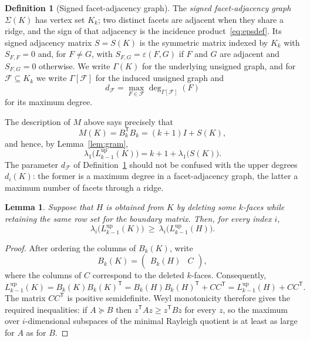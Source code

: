 \documentclass[11pt,reqno]{amsart}
\numberwithin{equation}{section}
\theoremstyle{plain}
\newtheorem{lemma}[theorem]{Lemma}
\theoremstyle{definition}
\newtheorem{definition}[theorem]{Definition}
\newcommand{\Lup}{L^{\mathrm{up}}}
\newcommand{\eps}{\varepsilon}
\newcommand{\T}{\mathsf{T}}
\newcommand{\Fset}{\mathcal F}
\begin{document}
\begin{definition}[Signed facet-adjacency graph]\label{def:sigma}
The \emph{signed facet-adjacency graph} $\Sigma(K)$ has vertex set $K_k$; two distinct facets are
adjacent when they share a ridge, and the sign of that adjacency is the incidence
product~\eqref{eq:epsdef}. Its signed adjacency matrix $S=S(K)$ is the symmetric matrix indexed
by $K_k$ with $S_{F,F}=0$ and, for $F\ne G$, with $S_{F,G}=\eps(F,G)$ if $F$ and $G$ are adjacent
and $S_{F,G}=0$ otherwise. We write $\Gamma(K)$ for the underlying unsigned graph, and for
$\Fset\subseteq K_k$ we write $\Gamma[\Fset]$ for the induced unsigned graph and
\[
  d_{\Fset}=\max_{F\in\Fset}\deg_{\Gamma[\Fset]}(F)
\]
for its maximum degree.
\end{definition}

The description of $M$ above says precisely that
\begin{equation}\label{eq:MS}
  M(K)=B_k^{\T}B_k=(k+1)I+S(K),
\end{equation}
and hence, by Lemma~\ref{lem:gram},
\begin{equation}\label{eq:lamS}
  \lambda_1\bigl(\Lup_{k-1}(K)\bigr)=k+1+\lambda_1\bigl(S(K)\bigr).
\end{equation}
The parameter $d_{\Fset}$ of Definition~\ref{def:sigma} should not be confused with the upper
degrees $d_i(K)$: the former is a maximum degree in a facet-adjacency graph, the latter a
maximum number of facets through a ridge.





\begin{lemma}\label{lem:deletion}
Suppose that $H$ is obtained from $K$ by deleting some $k$-faces while retaining the same row
set for the boundary matrix. Then, for every index $i$,
\[
  \lambda_i\bigl(\Lup_{k-1}(K)\bigr)\ \ge\ \lambda_i\bigl(\Lup_{k-1}(H)\bigr) .
\]
\end{lemma}

\begin{proof}
After ordering the columns of $B_k(K)$, write
\[
  B_k(K)=\begin{pmatrix}B_k(H) & C\end{pmatrix},
\]
where the columns of $C$ correspond to the deleted $k$-faces. Consequently,
\[
  \Lup_{k-1}(K)=B_k(K){B_k(K)}^{\T}
  =B_k(H){B_k(H)}^{\T}+CC^{\T}
  =\Lup_{k-1}(H)+CC^{\T}.
\]
The matrix $CC^{\T}$ is positive semidefinite. Weyl monotonicity therefore gives the required
inequalities: if $A\succeq B$ then $z^{\T}Az\ge z^{\T}Bz$ for every $z$, so the maximum over
$i$-dimensional subspaces of the minimal Rayleigh quotient is at least as large for $A$ as for
$B$.
\end{proof}
\end{document}
